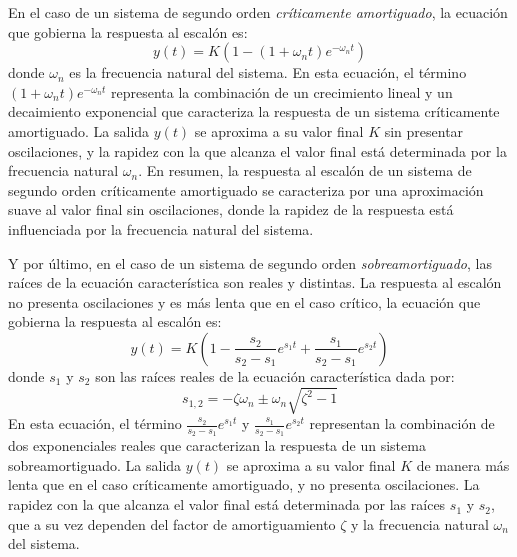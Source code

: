 En el caso de un sistema de segundo orden \emph{críticamente amortiguado}, la ecuación que gobierna la respuesta al escalón es:
\begin{equation}
    y(t) = K \left( 1 - (1 + \omega_n t) e^{-\omega_n t} \right)
\end{equation}
donde $\omega_n$ es la frecuencia natural del sistema. En esta ecuación, el término $(1 + \omega_n t) e^{-\omega_n t}$ representa la combinación de un crecimiento lineal y un decaimiento exponencial que caracteriza la respuesta de un sistema críticamente amortiguado. La salida $y(t)$ se aproxima a su valor final $K$ sin presentar oscilaciones, y la rapidez con la que alcanza el valor final está determinada por la frecuencia natural $\omega_n$. En resumen, la respuesta al escalón de un sistema de segundo orden críticamente amortiguado se caracteriza por una aproximación suave al valor final sin oscilaciones, donde la rapidez de la respuesta está influenciada por la frecuencia natural del sistema.    

Y por último, en el caso de un sistema de segundo orden \emph{sobreamortiguado}, las raíces de la ecuación característica son reales y distintas. La respuesta al escalón no presenta oscilaciones y es más lenta que en el caso crítico, la ecuación que gobierna la respuesta al escalón es:
\begin{equation}
y(t) = K \left( 1 - \frac{s_2}{s_2 - s_1} e^{s_1 t} + \frac{s_1}{s_2 - s_1} e^{s_2 t} \right)
\end{equation}
donde $s_1$ y $s_2$ son las raíces reales de la ecuación característica dada por:
\begin{equation}
s_{1,2} = -\zeta \omega_n \pm \omega_n \sqrt{\zeta^2 - 1}
\end{equation}
En esta ecuación, el término $\frac{s_2}{s_2 - s_1} e^{s_1 t}$ y $\frac{s_1}{s_2 - s_1} e^{s_2 t}$ representan la combinación de dos exponenciales reales que caracterizan la respuesta de un sistema sobreamortiguado. La salida $y(t)$ se aproxima a su valor final $K$ de manera más lenta que en el caso críticamente amortiguado, y no presenta oscilaciones. La rapidez con la que alcanza el valor final está determinada por las raíces $s_1$ y $s_2$, que a su vez dependen del factor de amortiguamiento $\zeta$ y la frecuencia natural $\omega_n$ del sistema.

